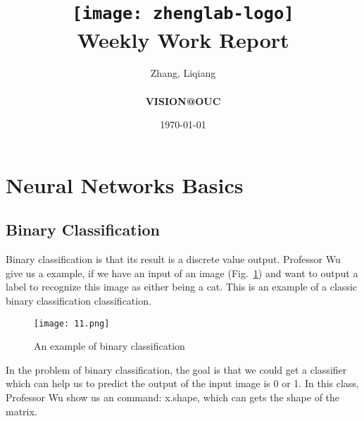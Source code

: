 \documentclass[a4paper]{article}
\title{
    \vspace*{1in}
    \texttt{[image: zhenglab-logo]} \\
    \vspace*{1.2in}
    \textbf{\huge Weekly Work Report}
    \vspace{0.2in}
}
\author{Zhang, Liqiang \\
    \vspace*{0.5in} \\
    \textbf{VISION@OUC} \\
    \vspace*{1in}
}
\date{\today}
\begin{document}
\maketitle
\setcounter{page}{0}
\thispagestyle{empty}
\newpage
\section{Neural Networks Basics}
\subsection{Binary Classification}
Binary classification is that its result is a discrete value output. Professor Wu give us a example, if we have an input of an image (Fig.~\ref{1}) and want to output a label to recognize this image as either being a cat. This is an example of a classic binary classification classification. 
\par
\begin{figure}[h]
\begin{center}
  \texttt{[image: 11.png]}\\
  \caption{An example of binary classification}\label{1}
\end{center}
\end{figure}
In the problem of binary classification, the goal is that we could get a classifier which can help us to predict the output of the input image is 0 or 1. In this class, Professor Wu show us an  command: x.shape, which can gets the shape of the matrix. 
\end{document}
